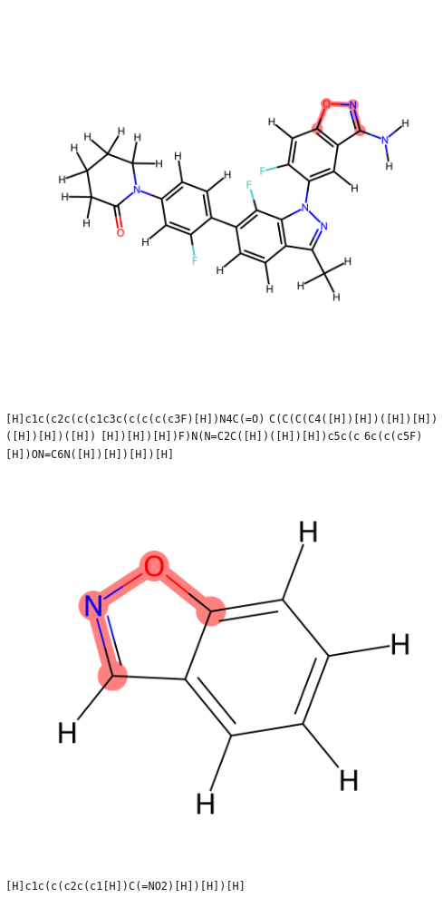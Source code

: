 \documentclass{article}
\begin{document}
\begin{figure}[ht]
\centering
    \includegraphics{mol06.png}
\end{figure}
\verb|[H]c1c(c2c(c(c1c3c(c(c(c(c3F)[H])N4C(=O)| \verb|C(C(C(C4([H])[H])([H])[H])([H])[H])([H])| \verb|[H])[H])[H])F)N(N=C2C([H])([H])[H])c5c(c| \verb|6c(c(c5F)[H])ON=C6N([H])[H])[H])[H]|

\begin{figure}[ht]
\centering
    \includegraphics{mol07.png}
\end{figure}
\verb|[H]c1c(c(c2c(c1[H])C(=NO2)[H])[H])[H]|
\end{document}

